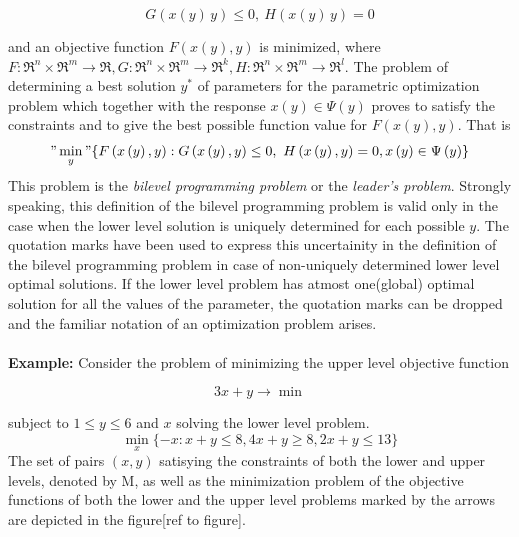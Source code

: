 \documentclass[a4paper, 12pt]{article}
\begin{document}
\begin{large}
\boldmath\begin{equation*}
G\left(x\left(y\right)\,y\right)\leq0,\ H\left(x\left(y\right)\,y\right)=0
\end{equation*}
\end{large}
\noindent
and an objective function $F\left(x\left(y\right),y\right)$ is minimized, where $F:\Re^{n}\times\Re^{m}\rightarrow\Re, G:\Re^{n}\times\Re^{m}\rightarrow\Re^{k}, H:\Re^{n}\times\Re^{m}\rightarrow\Re^{l}$. The problem of determining a best solution $y^{*}$ of parameters for the parametric optimization problem which together with the response $x\left(y\right)\in\Psi\left(y\right)$ proves to satisfy the constraints and to give the best possible function value for $F\left(x\left(y\right),y\right)$. That is\\
\boldmath\begin{equation*}
"\min_{y}"\{F\left(x\left(y\right),y\right):G\left(x\left(y\right),y\right)\leq0,\ H\left(x\left(y\right),y\right)=0, x\left(y\right)\in\Psi\left(y\right)\}
\end{equation*}
This problem is the \textit{bilevel programming problem} or the \textit{leader's problem}. Strongly speaking, this definition of the bilevel programming problem is valid only in the case when the lower level solution is uniquely determined for each possible $y$. The quotation marks have been used to express this uncertainity in the definition of the bilevel programming problem in case of non-uniquely determined lower level optimal solutions. If the lower level problem has atmost one(global) optimal solution for all the values of the parameter, the quotation marks can be dropped and the familiar notation of an optimization problem arises.\\~\\
\textbf{Example:}  Consider the problem of minimizing the upper level objective function
\begin{center}
\begin{large}
\boldmath\begin{equation*}
3x+y\rightarrow\min
\end{equation*}
\end{large}
\end{center}
subject to $1\leq{y}\leq6$ and $x$ solving the lower level problem.\\
\begin{equation*}
\min_{x}\{-x:x+y\leq8,4x+y\geq8,2x+y\leq13\}
\end{equation*}
The set of pairs $\left(x,y\right)$ satisying the constraints of both the lower and upper levels, denoted by M, as well as the minimization problem of the objective functions of both the lower and the upper level problems marked by the arrows are depicted in the figure[ref to figure].\\
\end{document}
